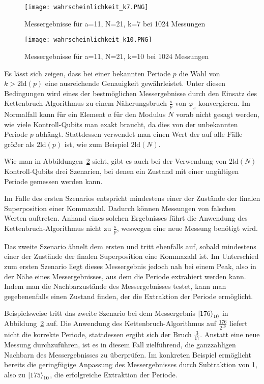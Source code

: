 \begin{figure} [H]
    \caption{Messergebnisse für a=11, N=21, k=7 bei 1024 Messungen}
    \label{fig:Messung7k}
    \texttt{[image: wahrscheinlichkeit\_k7.PNG]}
    \centering
    \end{figure}
\begin{figure} [H]
    \caption{Messergebnisse für a=11, N=21, k=10 bei 1024 Messungen}
    \label{fig:Messung10k}
    \texttt{[image: wahrscheinlichkeit\_k10.PNG]}
    \centering
    \end{figure}

Es lässt sich zeigen, dass bei einer bekannten Periode \(p\) die Wahl von \(k > 2\text{ld}(p)\) 
eine ausreichende Genauigkeit gewährleistet. 
Unter diesen Bedingungen wird eines der bestmöglichen Messergebnisse durch den Einsatz des Kettenbruch-Algorithmus zu einem Näherungsbruch \(\frac{s}{p}\) von \(\varphi_s\) konvergieren.
Im Normalfall kann für ein Element \(a\) für den Modulus \(N\) vorab nicht gesagt werden, 
wie viele Kontroll-Qubits man exakt braucht, 
da dies von der unbekannten Periode \(p\) abhängt.
Stattdessen verwendet man einen Wert der auf alle Fälle größer als \(2\text{ld}(p)\) ist, 
wie zum Beispiel \(2\text{ld}(N)\).~\cite{Shor_1997,mosca1999hidden}

Wie man in Abbildungen~\ref{fig:Messung10k} sieht, 
gibt es auch bei der Verwendung von \(2\text{ld}(N)\) Kontroll-Qubits drei Szenarien, 
bei denen ein Zustand mit einer ungültigen Periode gemessen werden kann.

Im Falle des ersten Szenarios 
entspricht mindestens einer der Zustände der finalen Superposition einer Kommazahl.
Dadurch können Messungen von falschen Werten auftreten.
Anhand eines solchen Ergebnisses führt die Anwendung des Kettenbruch-Algorithmus nicht zu \(\frac{s}{p}\), 
weswegen eine neue Messung benötigt wird.

Das zweite Szenario ähnelt dem ersten und tritt ebenfalls auf, 
sobald mindestens einer der Zustände der finalen Superposition eine Kommazahl ist. 
Im Unterschied zum ersten Szenario liegt dieses Messergebnis jedoch nah bei einem Peak, 
also in der Nähe eines Messergebnisses, aus dem die Periode extrahiert werden kann. 
Indem man die Nachbarzustände des Messergebnisses testet, kann man gegebenenfalls einen Zustand finden, 
der die Extraktion der Periode ermöglicht.

Beispielsweise tritt das zweite Szenario bei dem Messergebnis \(\ket{176}_{10}\) in Abbildung~\ref{fig:Messung10k} auf.
Die Anwendung des Kettenbruch-Algorithmus auf \(\frac{176}{2^{10}}\) 
liefert nicht die korrekte Periode, stattdessen ergibt sich der Bruch \(\frac{3}{17}\). 
Anstatt eine neue Messung durchzuführen,
ist es in diesem Fall zielführend, 
die ganzzahligen Nachbarn des Messergebnisses zu überprüfen.
Im konkreten Beispiel ermöglicht bereits die geringfügige Anpassung des Messergebnisses durch Subtraktion von 1, 
also zu \(\ket{175}_{10}\), 
die erfolgreiche Extraktion der Periode.

